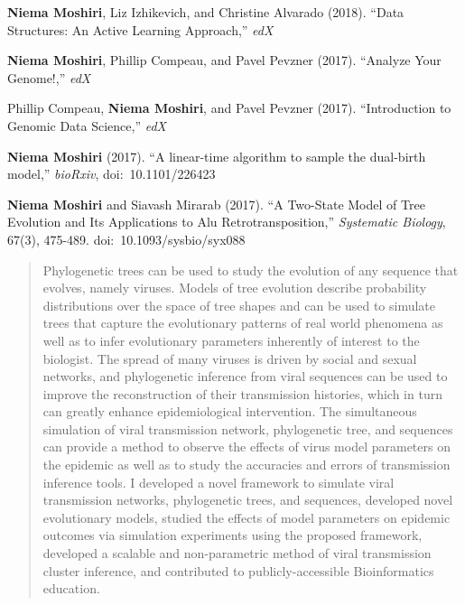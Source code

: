 \begin{frontmatter}
\begin{vitapage}
\begin{publications}
\item \textbf{Niema Moshiri}, Liz Izhikevich, and Christine Alvarado (2018). ``Data Structures: An Active Learning Approach,'' \textit{edX}
\item \textbf{Niema Moshiri}, Phillip Compeau, and Pavel Pevzner (2017). ``Analyze Your Genome!,'' \textit{edX}
\item Phillip Compeau, \textbf{Niema Moshiri}, and Pavel Pevzner (2017). ``Introduction to Genomic Data Science,'' \textit{edX}
\item \textbf{Niema Moshiri} (2017). ``A linear-time algorithm to sample the dual-birth model,'' \textit{bioRxiv}, doi:~10.1101/226423
\item \textbf{Niema Moshiri} and Siavash Mirarab (2017). ``A Two-State Model of Tree Evolution and Its Applications to Alu Retrotransposition,'' \textit{Systematic Biology}, 67(3), 475-489. doi:~10.1093/sysbio/syx088
\end{publications}
\end{vitapage}

\begin{abstract}
Phylogenetic trees can be used to study the evolution of any sequence that evolves, namely viruses. Models of tree evolution describe probability distributions over the space of tree shapes and can be used to simulate trees that capture the evolutionary patterns of real world phenomena as well as to infer evolutionary parameters inherently of interest to the biologist. The spread of many viruses is driven by social and sexual networks, and phylogenetic inference from viral sequences can be used to improve the reconstruction of their transmission histories, which in turn can greatly enhance epidemiological intervention. The simultaneous simulation of viral transmission network, phylogenetic tree, and sequences can provide a method to observe the effects of virus model parameters on the epidemic as well as to study the accuracies and errors of transmission inference tools. I developed a novel framework to simulate viral transmission networks, phylogenetic trees, and sequences, developed novel evolutionary models, studied the effects of model parameters on epidemic outcomes via simulation experiments using the proposed framework, developed a scalable and non-parametric method of viral transmission cluster inference, and contributed to publicly-accessible Bioinformatics education.
\end{abstract}
\end{frontmatter}


